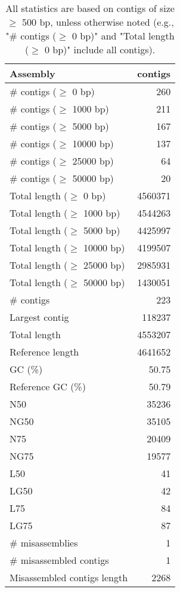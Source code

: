 \documentclass[12pt,a4paper]{article}
\begin{document}
\begin{table}[ht]
\begin{center}
\caption{All statistics are based on contigs of size $\geq$ 500 bp, unless otherwise noted (e.g., "\# contigs ($\geq$ 0 bp)" and "Total length ($\geq$ 0 bp)" include all contigs).}
\begin{tabular}{|l*{1}{|r}|}
\hline
Assembly & contigs \\ \hline
\# contigs ($\geq$ 0 bp) & 260 \\ \hline
\# contigs ($\geq$ 1000 bp) & 211 \\ \hline
\# contigs ($\geq$ 5000 bp) & 167 \\ \hline
\# contigs ($\geq$ 10000 bp) & 137 \\ \hline
\# contigs ($\geq$ 25000 bp) & 64 \\ \hline
\# contigs ($\geq$ 50000 bp) & 20 \\ \hline
Total length ($\geq$ 0 bp) & 4560371 \\ \hline
Total length ($\geq$ 1000 bp) & 4544263 \\ \hline
Total length ($\geq$ 5000 bp) & 4425997 \\ \hline
Total length ($\geq$ 10000 bp) & 4199507 \\ \hline
Total length ($\geq$ 25000 bp) & 2985931 \\ \hline
Total length ($\geq$ 50000 bp) & 1430051 \\ \hline
\# contigs & 223 \\ \hline
Largest contig & 118237 \\ \hline
Total length & 4553207 \\ \hline
Reference length & 4641652 \\ \hline
GC (\%) & 50.75 \\ \hline
Reference GC (\%) & 50.79 \\ \hline
N50 & 35236 \\ \hline
NG50 & 35105 \\ \hline
N75 & 20409 \\ \hline
NG75 & 19577 \\ \hline
L50 & 41 \\ \hline
LG50 & 42 \\ \hline
L75 & 84 \\ \hline
LG75 & 87 \\ \hline
\# misassemblies & 1 \\ \hline
\# misassembled contigs & 1 \\ \hline
Misassembled contigs length & 2268 \\ \hline

\end{tabular}
\end{center}
\end{table}
\end{document}
